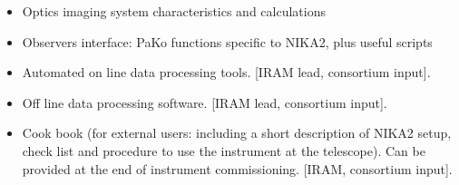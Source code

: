 \begin{itemize}

\item Optics imaging system characteristics and calculations

\item Observers interface: PaKo functions specific to NIKA2, plus useful scripts

\item Automated on line data processing tools. [IRAM lead, consortium input].

\item Off line data processing software. [IRAM lead, consortium input].

\item Cook book (for external users: including a short description of NIKA2 setup, check list and procedure to use the instrument at the telescope). Can be provided at the end of instrument commissioning. [IRAM, consortium input].

\end{itemize}
